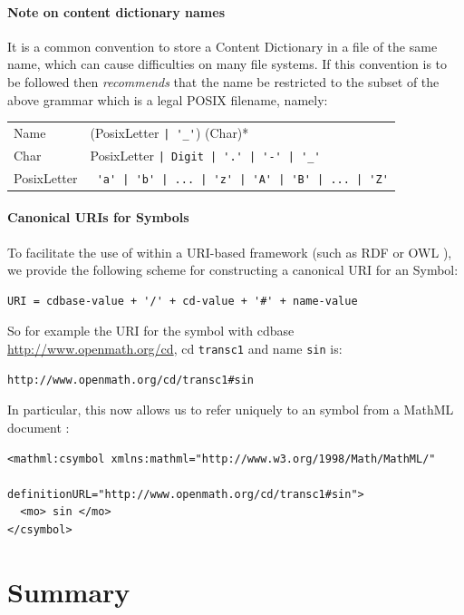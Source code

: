\paragraph{Note on content dictionary names}

It is a common convention to store a Content Dictionary in a file of
the same name, which can cause difficulties on many file systems.  If
this convention is to be followed then \OM
\emph{recommends} that the name be restricted to the
subset of the above grammar which is a legal POSIX
\cite{POSIX} filename, namely:

\begin{center}
\begin{tabular}{l@{$\longrightarrow$}p{10cm}}
Name & (PosixLetter \lstinline?| '_'?) (Char)*\\
Char &  PosixLetter \lstinline?| Digit | '.' | '-' | '_' ?\\
PosixLetter & \lstinline? 'a' | 'b' | ... | 'z' | 'A' | 'B' | ... | 'Z'?
\end{tabular}
\end{center}


\paragraph{Canonical URIs for Symbols}

To facilitate the use of \OM within a URI-based framework (such as RDF
\cite{rdf} or OWL \cite{owl}), we provide the
following scheme for constructing a canonical URI
for an \OM Symbol:
\begin{lstlisting}
URI = cdbase-value + '/' + cd-value + '#' + name-value
\end{lstlisting}
So for example the URI for the symbol with cdbase \url{http://www.openmath.org/cd}, cd
\lstinline|transc1| and name \lstinline|sin| is:
\begin{lstlisting}
http://www.openmath.org/cd/transc1#sin
\end{lstlisting}
In particular, this now allows us to refer uniquely to an \OM symbol from a
MathML document \cite{MathML_2003}:
\begin{lstlisting}
<mathml:csymbol xmlns:mathml="http://www.w3.org/1998/Math/MathML/"
                definitionURL="http://www.openmath.org/cd/transc1#sin">
  <mo> sin </mo> 
</csymbol>
\end{lstlisting}

\section{Summary}\label{sec_summary}

